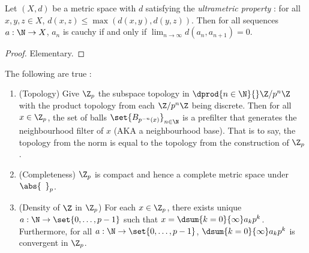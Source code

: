 \begin{prop}
  
  Let $(X,d)$ be a metric space with 
  $d$ satisfying the \emph{ultrametric property} : 
  for all $x, y, z \in X$, $d(x,z) \leq \max(d(x,y),d(y,z))$.
  Then for all sequences $a : \N \to X$, 
  $a_n$ is cauchy if and only if $\lim_{n\to\infty} d(a_n,a_{n+1}) = 0$.
\end{prop}
\begin{proof}
  Elementary. 
\end{proof}

\begin{prop}

  The following are true : 
  \begin{enumerate}
    \item (Topology) 
    Give $\Z_p$ the subspace topology in $\dprod{n \in \N}{}\Z/p^n\Z$ with 
    the product topology from each $\Z/p^n\Z$ being discrete. 
    Then for all $x \in \Z_p$, 
    the set of balls $\set{B_{p^{-n}(x)}}_{n \in \N}$ is 
    a prefilter that generates the neighbourhood filter of $x$
    (AKA a neighbourhood base). 
    That is to say, the topology from the norm is equal to 
    the topology from the construction of $\Z_p$. 
    \item (Completeness)
    $\Z_p$ is compact and
    hence a complete metric space under $\abs{\hspace{5pt}}_p$. 
    \item (Density of $\Z$ in $\Z_p$)
    For each $x \in \Z_p$, 
    there exists unique $a : \N \to \set{0,\dots,p-1}$ such that 
    $x = \dsum{k = 0}{\infty} a_k p^k$.
    Furthermore, for all $a : \N \to \set{0, \dots, p-1}$, 
    $\dsum{k = 0}{\infty} a_k p^k$ is convergent in $\Z_p$. 
  \end{enumerate}
\end{prop}
